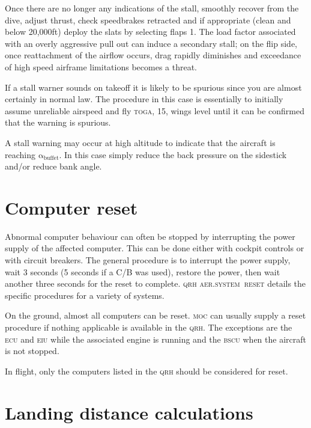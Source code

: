 \documentclass[a5paper,11pt,twoside]{book}
\newcommand{\ac}[1]{{\scshape\MakeLowercase{#1}}}
\newcommand{\inlcite}[1]{{\ac{#1}}}
\newcommand{\multicite}[1]{%
  \nopagebreak
  \noindent{{\color{blue}\footnotesize[ \inlcite{#1} ]}}
}
\begin{document}
Once there are no longer any indications of the stall, smoothly recover from the
dive, adjust thrust, check speedbrakes retracted and if appropriate (clean and
below 20,000ft) deploy the slats by selecting flaps 1. The load factor
associated with an overly aggressive pull out can induce a secondary stall; on
the flip side, once reattachment of the airflow occurs, drag rapidly diminishes
and exceedance of high speed airframe limitations becomes a threat.

If a stall warner sounds on takeoff it is likely to be spurious since you are
almost certainly in normal law. The procedure in this case is essentially to
initially assume unreliable airspeed and fly \ac{TOGA}, 15\textdegree , wings level
until it can be confirmed that the warning is spurious.

A stall warning may occur at high altitude to indicate that the aircraft is
reaching $\mathrm{\alpha_{buffet}}$. In this case simply reduce the back
pressure on the sidestick and/or reduce bank angle.

\multicite{FCOM~PRO.AER.MISC}


\section{Computer reset}

Abnormal computer behaviour can often be stopped by interrupting the power
supply of the affected computer. This can be done either with cockpit controls
or with circuit breakers. The general procedure is to interrupt the power
supply, wait 3 seconds (5 seconds if a C/B was used), restore the power, then
wait another three seconds for the reset to complete. \inlcite{QRH
  AER.SYSTEM~RESET} details the specific procedures for a variety of systems.

On the ground, almost all computers can be reset. \ac{MOC} can usually supply a
reset procedure if nothing applicable is available in the \ac{QRH}. The
exceptions are the \ac{ECU} and \ac{EIU} while the associated engine is running
and the \ac{BSCU} when the aircraft is not stopped.

In flight, only the computers listed in the \ac{QRH} should be considered for
reset.

\multicite{QRH~AER.SYSTEM~RESET}

\section{Landing distance calculations}
\end{document}
